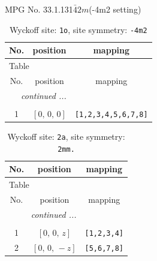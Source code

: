 \documentclass[fleqn,8pt]{jsarticle}
\begin{document}
\setcounter{MaxMatrixCols}{32}

\renewcommand{\tablename}{Table~}
\renewcommand{\figurename}{Figure~}
\begin{center}
\LARGE
MPG No. 33.1.131\quad$\bar{4}2m$\quad(-4m2 setting)
\end{center}
\renewcommand{\arraystretch}{1.2}
\begin{longtable}{ccc}
\caption{Wyckoff site: {\tt 1o}, site symmetry: {\tt -4m2}}
 \\
 \hline \hline
No. & position & mapping \\ \hline \endfirsthead

\multicolumn{2}{l}{\tablename\ \thetable{}} \\
 \hline \hline
No. & position & mapping \\ \hline \endhead

 \hline \hline
\multicolumn{2}{r}{\footnotesize\it continued ...} \\ \endfoot

 \hline \hline
\multicolumn{2}{r}{} \\ \endlastfoot

1 & $\left[ 0,\, 0,\, 0 \right]$ & {\tt [1,2,3,4,5,6,7,8]} \\
\end{longtable}
\renewcommand{\arraystretch}{1.2}
\begin{longtable}{ccc}
\caption{Wyckoff site: {\tt 2a}, site symmetry: {\tt 2mm.}}
 \\
 \hline \hline
No. & position & mapping \\ \hline \endfirsthead

\multicolumn{2}{l}{\tablename\ \thetable{}} \\
 \hline \hline
No. & position & mapping \\ \hline \endhead

 \hline \hline
\multicolumn{2}{r}{\footnotesize\it continued ...} \\ \endfoot

 \hline \hline
\multicolumn{2}{r}{} \\ \endlastfoot

1 & $\left[ 0,\, 0,\, z \right]$ & {\tt [1,2,3,4]} \\ \hline
2 & $\left[ 0,\, 0,\, - z \right]$ & {\tt [5,6,7,8]} \\
\end{longtable}
\renewcommand{\arraystretch}{1.2}
\end{document}
